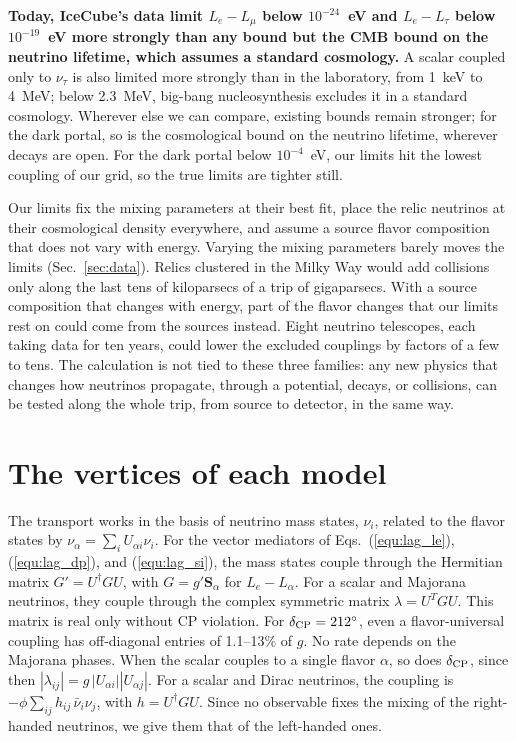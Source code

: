\documentclass[linenumbers, aps, prd, twocolumn, superscriptaddress, floatfix, longbibliography, nofootinbib, bibnotes]{revtex4-2}
\begin{document}
\textbf{Today, IceCube's data limit $L_e - L_\mu$ below $10^{-24}$~eV and $L_e - L_\tau$ below $10^{-19}$~eV more strongly than any bound but the CMB bound on the neutrino lifetime, which assumes a standard cosmology.}
A scalar coupled only to $\nu_\tau$ is also limited more strongly than in the laboratory, from 1~keV to 4~MeV; below 2.3~MeV, big-bang nucleosynthesis excludes it in a standard cosmology.
Wherever else we can compare, existing bounds remain stronger; for the dark portal, so is the cosmological bound on the neutrino lifetime, wherever decays are open.
For the dark portal below $10^{-4}$~eV, our limits hit the lowest coupling of our grid, so the true limits are tighter still.

Our limits fix the mixing parameters at their best fit, place the relic neutrinos at their cosmological density everywhere, and assume a source flavor composition that does not vary with energy.
Varying the mixing parameters barely moves the limits (Sec.~\ref{sec:data}).
Relics clustered in the Milky Way would add collisions only along the last tens of kiloparsecs of a trip of gigaparsecs.
With a source composition that changes with energy, part of the flavor changes that our limits rest on could come from the sources instead.
Eight neutrino telescopes, each taking data for ten years, could lower the excluded couplings by factors of a few to tens.
The calculation is not tied to these three families: any new physics that changes how neutrinos propagate, through a potential, decays, or collisions, can be tested along the whole trip, from source to detector, in the same way.

\appendix

\renewcommand{\theHfigure}{\thesection.\arabic{figure}}
\renewcommand{\theHtable}{\thesection.\arabic{table}}

\section{The vertices of each model}
\label{app:vertices}
The transport works in the basis of neutrino mass states, $\nu_i$, related to the flavor states by $\nu_\alpha = \sum_i U_{\alpha i} \nu_i$.
For the vector mediators of Eqs.~(\ref{equ:lag_le}), (\ref{equ:lag_dp}), and (\ref{equ:lag_si}), the mass states couple through the Hermitian matrix $G' = U^\dagger G U$, with $G = g' \mathbf{S}_\alpha$ for $L_e - L_\alpha$.
For a scalar and Majorana neutrinos, they couple through the complex symmetric matrix $\lambda = U^T G U$.
This matrix is real only without CP violation.
For $\delta_{\rm CP} = 212^\circ$, even a flavor-universal coupling has off-diagonal entries of 1.1--13\% of $g$.
No rate depends on the Majorana phases.
When the scalar couples to a single flavor $\alpha$, so does $\delta_{\rm CP}$, since then $|\lambda_{ij}| = g\, |U_{\alpha i}| |U_{\alpha j}|$.
For a scalar and Dirac neutrinos, the coupling is $-\phi \sum_{ij} h_{ij}\, \bar\nu_i \nu_j$, with $h = U^\dagger G U$.
Since no observable fixes the mixing of the right-handed neutrinos, we give them that of the left-handed ones.
\end{document}
